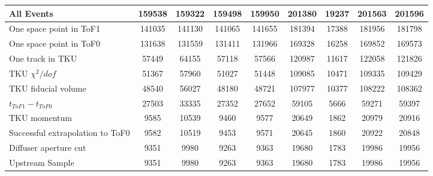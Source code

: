 \begin{landscape}
\begin{table}
\begin{tabular}[pos]{l|cccccccc}
\hline                                            
All Events                                         &  159538  &  159322  &  159498  &  159950  &  201380  &   19237  &  201563  &  201596  \\
\hline                                            
One space point in ToF1                            &  141035  &  141130  &  141065  &  141655  &  181394  &   17388  &  181956  &  181798  \\
One space point in ToF0                            &  131638  &  131559  &  131411  &  131966  &  169328  &   16258  &  169852  &  169573  \\
One track in TKU                                   &   57449  &   64155  &   57118  &   57566  &  120987  &   11617  &  122058  &  121826  \\
TKU $\chi^2/dof$                                   &   51367  &   57960  &   51027  &   51448  &  109085  &   10471  &  109335  &  109429  \\
TKU fiducial volume                                &   48540  &   56027  &   48180  &   48721  &  107977  &   10377  &  108222  &  108362  \\
\hline                                            
$t_{ToF1} - t_{ToF0}$                              &   27503  &   33335  &   27352  &   27652  &   59105  &    5666  &   59271  &   59397  \\
TKU momentum                                       &    9585  &   10539  &    9460  &    9577  &   20649  &    1862  &   20979  &   20916  \\
\hline                                            
Successful extrapolation to ToF0                   &    9582  &   10519  &    9453  &    9571  &   20645  &    1860  &   20922  &   20848  \\
Diffuser aperture cut                              &    9351  &    9980  &    9263  &    9363  &   19680  &    1783  &   19986  &   19956  \\
\hline                                            
Upstream Sample                                    &    9351  &    9980  &    9263  &    9363  &   19680  &    1783  &   19986  &   19956  \\
\hline                                            

\end{tabular}
\end{table}
\end{landscape}


